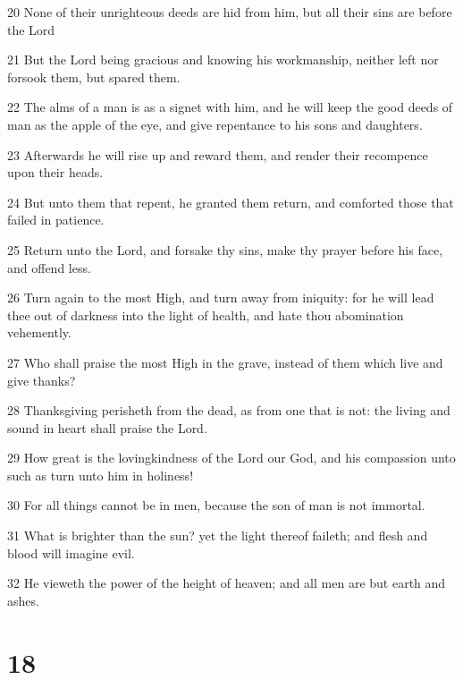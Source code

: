 \par 20 None of their unrighteous deeds are hid from him, but all their sins are before the Lord
\par 21 But the Lord being gracious and knowing his workmanship, neither left nor forsook them, but spared them.
\par 22 The alms of a man is as a signet with him, and he will keep the good deeds of man as the apple of the eye, and give repentance to his sons and daughters.
\par 23 Afterwards he will rise up and reward them, and render their recompence upon their heads.
\par 24 But unto them that repent, he granted them return, and comforted those that failed in patience.
\par 25 Return unto the Lord, and forsake thy sins, make thy prayer before his face, and offend less.
\par 26 Turn again to the most High, and turn away from iniquity: for he will lead thee out of darkness into the light of health, and hate thou abomination vehemently.
\par 27 Who shall praise the most High in the grave, instead of them which live and give thanks?
\par 28 Thanksgiving perisheth from the dead, as from one that is not: the living and sound in heart shall praise the Lord.
\par 29 How great is the lovingkindness of the Lord our God, and his compassion unto such as turn unto him in holiness!
\par 30 For all things cannot be in men, because the son of man is not immortal.
\par 31 What is brighter than the sun? yet the light thereof faileth; and flesh and blood will imagine evil.
\par 32 He vieweth the power of the height of heaven; and all men are but earth and ashes.

\chapter{18}

